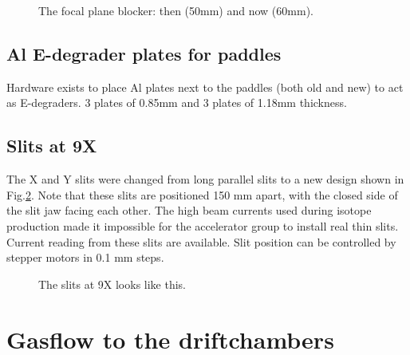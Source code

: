 \documentclass[11pt]{report}
\begin{document}
\begin{figure}[!ht]
\centerline{\vspace{0cm}\hspace{0cm}
}
\centering
\caption{The focal plane blocker: then (50mm) and now (60mm).}
\label{fig:fpbs-then-now}
\end{figure} 




\section{Al E-degrader plates for paddles}

Hardware exists to place Al plates next to the paddles (both old and new)
to act as E-degraders. 3 plates of 0.85mm and 3 plates of 1.18mm thickness.

\section{Slits at 9X}

The X and Y slits were changed from long parallel slits to a new design
shown in Fig.\ref{fig:thinslit}.  Note that these slits are positioned 150 mm apart, with
the closed side of the slit jaw facing each other.
The high beam currents used during isotope production
made it impossible for the accelerator group to install real thin slits.
Current reading from these slits are available.
Slit position can be controlled by stepper motors in 0.1 mm steps.


\begin{figure}[!ht]
\centerline{\vspace{0cm}\hspace{0cm}
}
\centering
\caption{The slits at 9X looks like this.}
\label{fig:thinslit}
\end{figure} 





\clearpage










\chapter{Gasflow to the driftchambers}
\end{document}
